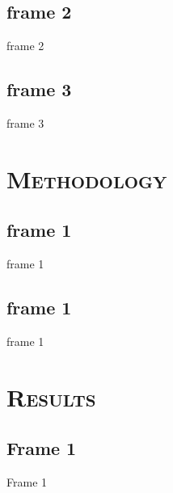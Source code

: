 \documentclass[xcolor=x11names,compress]{beamer}
\begin{document}
\subsection{frame 2}
\begin{frame}{frame 2}

\end{frame}

\subsection{frame 3}
\begin{frame}{frame 3}

\end{frame}



\section{\scshape Methodology}
\subsection{frame 1}
\begin{frame}{frame 1}

\end{frame}


\subsection{frame 1}
\begin{frame}{frame 1}

\end{frame}


\section{\scshape Results}
\subsection{Frame 1}
\begin{frame}{Frame 1}

\end{frame}
\end{document}
